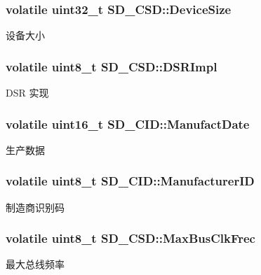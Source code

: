 \subsubsection[{\texorpdfstring{Device\+Size}{DeviceSize}}]{\setlength{\rightskip}{0pt plus 5cm}volatile uint32\+\_\+t S\+D\+\_\+\+C\+S\+D\+::\+Device\+Size}\hypertarget{group__sd__card_ga3ef41bf634f8340f737de91de78e33f8}{}\label{group__sd__card_ga3ef41bf634f8340f737de91de78e33f8}
设备大小 
\subsubsection[{\texorpdfstring{D\+S\+R\+Impl}{DSRImpl}}]{\setlength{\rightskip}{0pt plus 5cm}volatile uint8\+\_\+t S\+D\+\_\+\+C\+S\+D\+::\+D\+S\+R\+Impl}\hypertarget{group__sd__card_ga96e5ee8c184999bd5f2b007015e2a7a9}{}\label{group__sd__card_ga96e5ee8c184999bd5f2b007015e2a7a9}
D\+SR 实现 
\subsubsection[{\texorpdfstring{Manufact\+Date}{ManufactDate}}]{\setlength{\rightskip}{0pt plus 5cm}volatile uint16\+\_\+t S\+D\+\_\+\+C\+I\+D\+::\+Manufact\+Date}\hypertarget{group__sd__card_ga6fa8e16f55984066e24cf2503477dfcd}{}\label{group__sd__card_ga6fa8e16f55984066e24cf2503477dfcd}
生产数据 
\subsubsection[{\texorpdfstring{Manufacturer\+ID}{ManufacturerID}}]{\setlength{\rightskip}{0pt plus 5cm}volatile uint8\+\_\+t S\+D\+\_\+\+C\+I\+D\+::\+Manufacturer\+ID}\hypertarget{group__sd__card_gac16d38fcef6d661738d8f880f899a5ee}{}\label{group__sd__card_gac16d38fcef6d661738d8f880f899a5ee}
制造商识别码 
\subsubsection[{\texorpdfstring{Max\+Bus\+Clk\+Frec}{MaxBusClkFrec}}]{\setlength{\rightskip}{0pt plus 5cm}volatile uint8\+\_\+t S\+D\+\_\+\+C\+S\+D\+::\+Max\+Bus\+Clk\+Frec}\hypertarget{group__sd__card_gab044e6cb2434800c2dd10fbd71519a64}{}\label{group__sd__card_gab044e6cb2434800c2dd10fbd71519a64}
最大总线频率 
